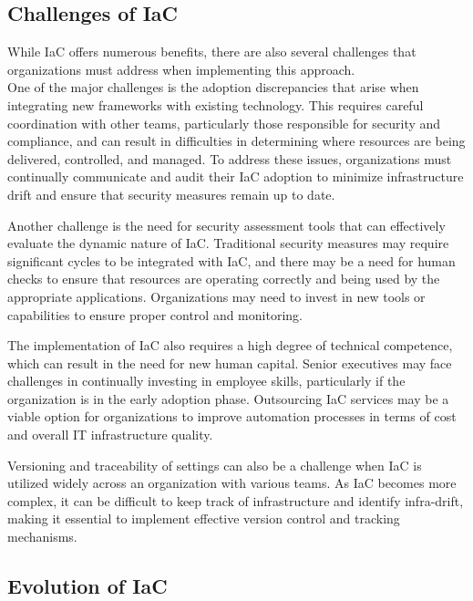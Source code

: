 \subsection{Challenges of IaC}

While IaC offers numerous benefits, there are also several challenges that organizations must address when implementing this approach.\\
One of the major challenges is the adoption discrepancies that arise when integrating new frameworks with existing technology. This requires careful coordination with other teams, particularly those responsible for security and compliance, and can result in difficulties in determining where resources are being delivered, controlled, and managed. To address these issues, organizations must continually communicate and audit their IaC adoption to minimize infrastructure drift and ensure that security measures remain up to date.

Another challenge is the need for security assessment tools that can effectively evaluate the dynamic nature of IaC. Traditional security measures may require significant cycles to be integrated with IaC, and there may be a need for human checks to ensure that resources are operating correctly and being used by the appropriate applications. Organizations may need to invest in new tools or capabilities to ensure proper control and monitoring.

The implementation of IaC also requires a high degree of technical competence, which can result in the need for new human capital. Senior executives may face challenges in continually investing in employee skills, particularly if the organization is in the early adoption phase. Outsourcing IaC services may be a viable option for organizations to improve automation processes in terms of cost and overall IT infrastructure quality.

Versioning and traceability of settings can also be a challenge when IaC is utilized widely across an organization with various teams. As IaC becomes more complex, it can be difficult to keep track of infrastructure and identify infra-drift, making it essential to implement effective version control and tracking mechanisms.




\subsection{Evolution of IaC}

